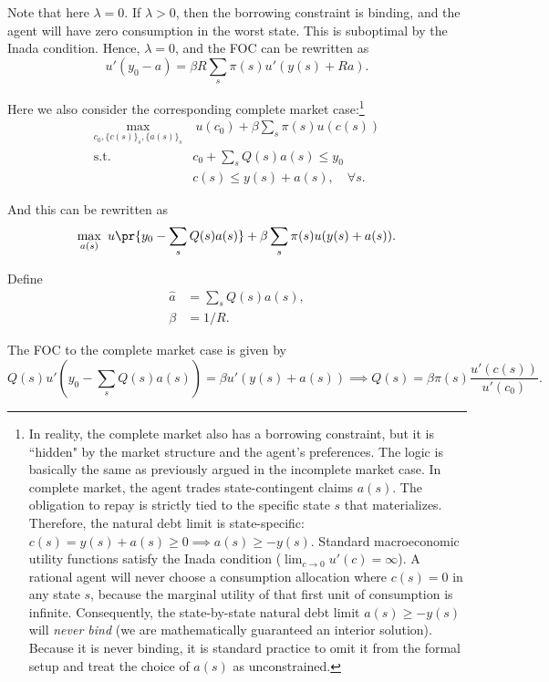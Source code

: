 Note that here $\lambda = 0$. If $\lambda > 0$, then the borrowing constraint is binding, and the agent will have zero consumption in the worst state. This is suboptimal by the Inada condition. Hence, $\lambda = 0$, and the FOC can be rewritten as
\[u'(y_0 - a) = \beta R \sum_s \pi(s) u'(y(s) + Ra).
\]

Here we also consider the corresponding complete market case:\footnote{
    In reality, the complete market also has a borrowing constraint, but it is ``hidden" by the market structure and the agent's preferences. The logic is basically the same as previously argued in the incomplete market case. In complete market, the agent trades state-contingent claims $a(s)$. The obligation to repay is strictly tied to the specific state $s$ that materializes. Therefore, the natural debt limit is state-specific: $c(s) = y(s) + a(s) \ge 0 \implies a(s) \ge -y(s)$. Standard macroeconomic utility functions satisfy the Inada condition ($\lim_{c \to 0} u'(c) = \infty$). A rational agent will never choose a consumption allocation where $c(s) = 0$ in any state $s$, because the marginal utility of that first unit of consumption is infinite. Consequently, the state-by-state natural debt limit $a(s) \ge -y(s)$ will \textit{never bind} (we are mathematically guaranteed an interior solution). Because it is never binding, it is standard practice to omit it from the formal setup and treat the choice of $a(s)$ as unconstrained.
}
\[
\begin{aligned}
    \max_{c_0, \{c(s)\}_{s}, \{a(s)\}_s} & \ u(c_0) + \beta \sum_s\pi(s)u(c(s))\\
    \text{s.t. } & c_0+\sum_s Q(s)a(s)\le y_0\\
& c(s) \le y(s) + a(s), \quad \forall s.
\end{aligned}
\]

And this can be rewritten as
\[
\max_{a(s)} \ u\pr{y_0 - \sum_s Q(s)a(s)} + \beta \sum_s\pi(s)u(y(s) + a(s)).
\]

Define 
\[
\begin{aligned}
    \hat a & = \sum_s Q(s)a(s),\\
    \beta & = 1/R.
\end{aligned}
\]

The FOC to the complete market case is given by
\[
Q(s)u'(y_0 - \sum_s Q(s)a(s)) = \beta u'(y(s) + a(s))\implies Q(s) = \beta \pi(s)\frac{u'(c(s))}{u'(c_0)}.
\]

